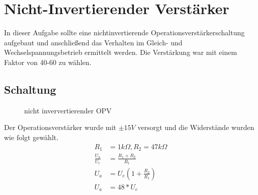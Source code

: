 
\section{Nicht-Invertierender Verst\"arker}

In dieser Aufgabe sollte eine nichtinvertierende Operationsverstärkerschaltung aufgebaut und anschließend das Verhalten im
Gleich- und Wechselspannungsbetrieb ermittelt werden. Die Verstärkung war mit einem Faktor von 40-60 zu wählen.\\

\subsection{Schaltung}
\begin{figure}[H]
  \begin{center}
    \caption{nicht inververtierender OPV}
  \end{center}
\end{figure}
\noindent
Der Operationsverstärker wurde mit $\pm15V$ versorgt und die Widerstände wurden wie folgt gewählt.\\
\begin{align*}
 R_1 &= 1k\Omega, R_2 = 47k\Omega\\
 \frac{U_a}{U_e} &= \frac{R_1 + R_2}{R_1}\\
 U_a &= U_e(1 + \frac{R_2}{R_1})\\
 U_a &= 48*U_e\\
\end{align*}

